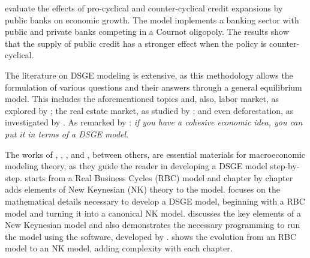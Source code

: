 \documentclass[../thesis.tex]{subfiles}
\begin{document}
\textcite{capeleti_countercyclical_2022} evaluate the effects of pro-cyclical and counter-cyclical credit expansions by public banks on economic growth. The model implements a banking sector with public and private banks competing in a Cournot oligopoly. The results show that the supply of public credit has a stronger effect when the policy is counter-cyclical.


The literature on DSGE modeling is extensive, as this methodology allows the formulation of various questions and their answers through a general equilibrium model. This includes the aforementioned topics and, also, labor market, as explored by \textcite{ribeiro_alongamento_2023}; the real estate market, as studied by \textcite{albuquerquemello_mercado_2018}; and even deforestation, as investigated by \textcite{pereira_desmatamento_2013}. As remarked by \textcite{solis-garcia_ucb_2022}: \textit{if you have a cohesive economic idea, you can put it in terms of a DSGE model}. %

The works of \textcite{costa_junior_understanding_2016}, \textcite{solis-garcia_ucb_2022}, \textcite{bergholt_basic_2012}, and \textcite{gali_monetary_2015}, between others, are essential materials for macroeconomic modeling theory, as they guide the reader in developing a DSGE model step-by-step. \textcite{costa_junior_understanding_2016} starts from a Real Business Cycles (RBC) model and chapter by chapter adds elements of New Keynesian (NK) theory to the model. \textcite{solis-garcia_ucb_2022} focuses on the mathematical details necessary to develop a DSGE model, beginning with a RBC model and turning it into a canonical NK model. \textcite{bergholt_basic_2012} discusses the key elements of a New Keynesian model and also demonstrates the necessary programming to run the model using the \dynare{} software, developed by \textcite{adjemian_dynare_2023}. \textcite{gali_monetary_2015} shows the evolution from an RBC model to an NK model, adding complexity with each chapter.


\end{document}
